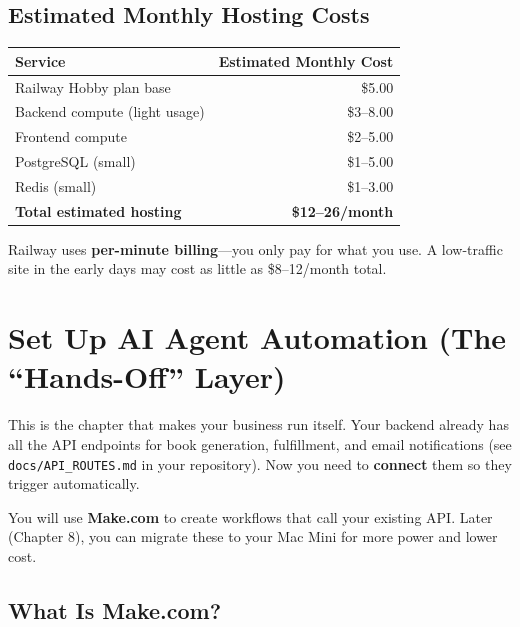 \documentclass[12pt, letterpaper, oneside]{book}
\begin{document}
\section{Estimated Monthly Hosting Costs}

\begin{table}[H]
\centering
\begin{tabular}{lr}
\toprule
\textbf{Service} & \textbf{Estimated Monthly Cost} \\
\midrule
Railway Hobby plan base & \$5.00 \\
Backend compute (light usage) & \$3--8.00 \\
Frontend compute & \$2--5.00 \\
PostgreSQL (small) & \$1--5.00 \\
Redis (small) & \$1--3.00 \\
\midrule
\textbf{Total estimated hosting} & \textbf{\$12--26/month} \\
\bottomrule
\end{tabular}
\end{table}

\begin{infobox}
Railway uses \textbf{per-minute billing}---you only pay for what you use. A low-traffic site in the early days may cost as little as \$8--12/month total.
\end{infobox}

\chapter{Set Up AI Agent Automation (The ``Hands-Off'' Layer)}

This is the chapter that makes your business run itself. Your backend already has all the API endpoints for book generation, fulfillment, and email notifications (see \texttt{docs/API\_ROUTES.md} in your repository). Now you need to \textbf{connect} them so they trigger automatically.

You will use \textbf{Make.com} to create workflows that call your existing API. Later (Chapter 8), you can migrate these to your Mac Mini for more power and lower cost.

\section{What Is Make.com?}
\end{document}
